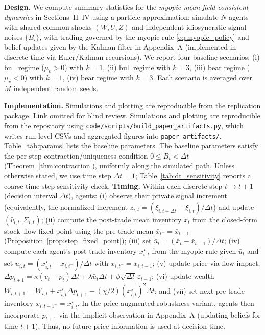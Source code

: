
\textbf{Design.} We compute summary statistics for the \emph{myopic mean-field consistent dynamics} in Sections~II--IV using a particle approximation: simulate $N$ agents with shared common shocks $(W,U,Z)$ and independent idiosyncratic signal noises $\{B_i\}$, with trading governed by the myopic rule \eqref{eq:myopic_policy} and belief updates given by the Kalman filter in Appendix~A (implemented in discrete time via Euler/Kalman recursions). We report four baseline scenarios:
(i) bull regime ($\mu_v>0$) with $k=1$,
(ii) bull regime with $k=3$,
(iii) bear regime ($\mu_v<0$) with $k=1$,
(iv) bear regime with $k=3$.
Each scenario is averaged over $M$ independent random seeds.

\textbf{Implementation.} \ifjeicblind Simulations and plotting are reproducible from the replication package. Link omitted for blind review. \else Simulations and plotting are reproducible from the repository using
\texttt{code/scripts/}\allowbreak\texttt{build\_paper\_artifacts.py}, which writes run-level CSVs and aggregated figures into \texttt{paper\_artifacts/}. \fi Table~\ref{tab:params} lists the baseline parameters.
The baseline parameters satisfy the per-step contraction/uniqueness condition $0\le B_t<\Delta t$ (Theorem~\ref{thm:contraction}), uniformly along the simulated path.
Unless otherwise stated, we use time step $\Delta t=1$; Table~\ref{tab:dt_sensitivity} reports a coarse time-step sensitivity check.
\textbf{Timing.} Within each discrete step $t\to t+1$ (decision interval $\Delta t$), agents:
(i) observe their private signal increment (equivalently, the normalized increment $z_{i,t}=(\xi_{i,t+\Delta t}-\xi_{i,t})/\Delta t$) and update $(\hat v_{i,t},\Sigma_{i,t})$;
(ii) compute the post-trade mean inventory $\bar x_t$ from the closed-form stock--flow fixed point using the pre-trade mean $\bar x_{t^-}=\bar x_{t-1}$ (Proposition~\ref{prop:step_fixed_point});
(iii) set $\bar u_t=(\bar x_t-\bar x_{t-1})/\Delta t$;
(iv) compute each agent's post-trade inventory $x^\star_{i,t}$ from the myopic rule given $\bar u_t$ and set $u_{i,t}=(x^\star_{i,t}-x_{i,t^-})/\Delta t$ with $x_{i,t^-}=x_{i,t-1}$;
(v) update price via flow impact, $\Delta p_{t+1}=\kappa(v_t-p_t)\Delta t+\lambda\bar u_t\Delta t+\phi\sqrt{\Delta t}\,\varepsilon_{t+1}$;
(vi) update wealth $W_{i,t+1}=W_{i,t}+x^\star_{i,t}\Delta p_{t+1}-(\chi/2)(x^\star_{i,t})^2\Delta t$; and
(vii) set next pre-trade inventory $x_{i,t+1^-}=x^\star_{i,t}$.
In the price-augmented robustness variant, agents then incorporate $p_{t+1}$ via the implicit observation in Appendix~A (updating beliefs for time $t+1$). Thus, no future price information is used at decision time.

